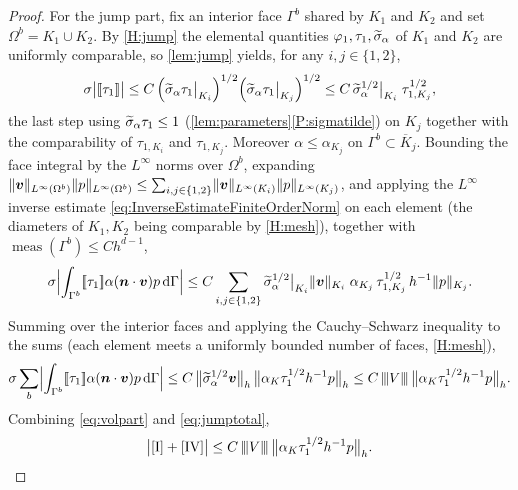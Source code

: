 \begin{proof}
For the jump part, fix an interior face $\Gamma^b$ shared by $K_1$ and $K_2$ and set
$\Omega^b=K_1\cup K_2$. By \cref{H:jump} the elemental quantities
$\varphi_1,\tau_1,\widetilde{\sigma}_{\alpha}$ of $K_1$ and $K_2$ are uniformly comparable, so
\cref{lem:jump} yields, for any $i,j\in\{1,2\}$,
\begin{equation}\label{eq:jumpsplit}
  \sigma\bigl|[\![\tau_1]\!]\bigr|
  \le C\,\Bigl(\widetilde{\sigma}_{\alpha}\tau_1\big|_{K_i}\Bigr)^{1/2}
        \Bigl(\widetilde{\sigma}_{\alpha}\tau_1\big|_{K_j}\Bigr)^{1/2}
  \le C\,\widetilde{\sigma}_{\alpha}^{1/2}\big|_{K_i}\;\tau_{1,K_j}^{1/2},
\end{equation}
the last step using $\widetilde{\sigma}_{\alpha}\tau_1\le1$ (\cref{lem:parameters}\ref{P:sigmatilde})
on $K_j$ together with the comparability of $\tau_{1,K_i}$ and $\tau_{1,K_j}$.
Moreover $\alpha\le\alpha_{K_j}$ on $\Gamma^b\subset\overline{K}_j$. Bounding the face
integral by the $L^\infty$ norms over $\Omega^b$, expanding
$\lVert\boldsymbol{v}\rVert_{L^\infty(\Omega^b)}\lVert p\rVert_{L^\infty(\Omega^b)}
\le\sum_{i,j\in\{1,2\}}\lVert\boldsymbol{v}\rVert_{L^\infty(K_i)}\lVert p\rVert_{L^\infty(K_j)}$, and applying
the $L^\infty$ inverse estimate \eqref{eq:InverseEstimateFiniteOrderNorm} on each element (the diameters of
$K_1,K_2$ being comparable by \cref{H:mesh}), together with
$\operatorname{meas}(\Gamma^b)\le C h^{d-1}$,
\begin{equation}\label{eq:jumppart}
  \sigma\Bigl|\int_{\Gamma^b}[\![\tau_1]\!]\alpha(\boldsymbol{n}\cdot\boldsymbol{v})p\,\mathrm{d}\Gamma\Bigr|
  \le C\sum_{i,j\in\{1,2\}}
  \widetilde{\sigma}_{\alpha}^{1/2}\big|_{K_i}\lVert\boldsymbol{v}\rVert_{K_i}\;
  \alpha_{K_j}\,\tau_{1,K_j}^{1/2}\,h^{-1}\lVert p\rVert_{K_j}.
\end{equation}
Summing over the interior faces and applying the Cauchy--Schwarz inequality to the sums
(each element meets a uniformly bounded number of faces, \cref{H:mesh}),
\begin{equation}\label{eq:jumptotal}
  \sigma\sum_{b}\Bigl|\int_{\Gamma^b}[\![\tau_1]\!]\alpha(\boldsymbol{n}\cdot\boldsymbol{v})p
  \,\mathrm{d}\Gamma\Bigr|
  \le C\,\bigl\lVert\widetilde{\sigma}_{\alpha}^{1/2}\boldsymbol{v}\bigr\rVert_h\,
  \bigl\lVert\alpha_K\tau_1^{1/2}h^{-1}p\bigr\rVert_h
  \le C\,{\lvert\kern-0.25ex\lvert\kern-0.25ex\lvert V \rvert\kern-0.25ex\rvert\kern-0.25ex\rvert}\,
  \bigl\lVert\alpha_K\tau_1^{1/2}h^{-1}p\bigr\rVert_h .
\end{equation}
Combining \eqref{eq:volpart} and \eqref{eq:jumptotal},
\begin{equation}\label{eq:IIVbound}
  \bigl|\textup{[I]}+\textup{[IV]}\bigr|
  \le C\,{\lvert\kern-0.25ex\lvert\kern-0.25ex\lvert V \rvert\kern-0.25ex\rvert\kern-0.25ex\rvert}\,
  \bigl\lVert\alpha_K\tau_1^{1/2}h^{-1}p\bigr\rVert_h .
\end{equation}


\end{proof}
